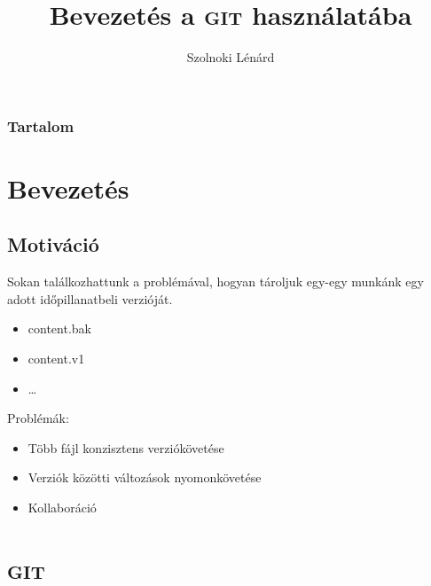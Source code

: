 

\newcommand{\git}{\textsc{git} }

\title{Bevezetés a \git használatába}
\author[Szolnoki Lénárd]{Szolnoki Lénárd}




\begin{frame}
 \titlepage
\end{frame}

\begin{frame}[noframenumbering]
 \frametitle{Tartalom}
 \tableofcontents
\end{frame}

\section{Bevezetés}
	\subsection{Motiváció}
	\begin{frame}
	  Sokan találkozhattunk a problémával, hogyan tároljuk egy-egy munkánk egy adott időpillanatbeli verzióját.
	  \begin{itemize}
	    \item{content.bak}
	    \item{content.v1}
	    \item{\dots}
	  \end{itemize}
	  
	  Problémák:
	  \begin{itemize}
	    \item{Több fájl konzisztens verziókövetése}
	    \item{Verziók közötti változások nyomonkövetése}
	    \item{Kollaboráció}
	  \end{itemize}
	\end{frame}

\section{\git}
